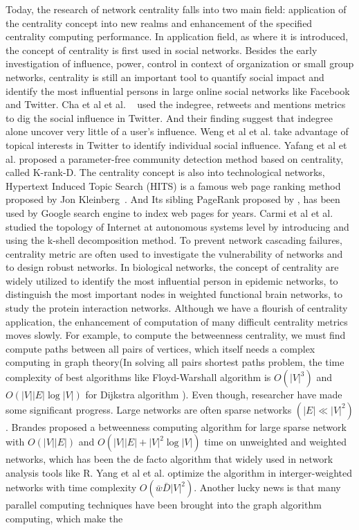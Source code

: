 \documentclass[symmetry,article,submit,moreauthors,pdftex,10pt,a4paper]{Definitions/mdpi}
\makeatletter
\newcommand*{\etal}{%
    \@ifnextchar{.}%
        {et al}%
        {et al.\@\xspace}%
}
\makeatother
\begin{document}
Today, the research of network centrality falls into two main field: application of the centrality concept into new realms and enhancement of the specified centrality computing performance. In application field, as where it is introduced, the concept of centrality is first used in social networks. Besides the early investigation of influence, power, control in context of organization or small group networks\cite{coleman1966medical, laumann1973new, granovetter1995getting, burt1982toward }, centrality is still an important tool to quantify social impact and identify the most influential persons in large online social networks like Facebook and Twitter.  Cha \etal~\cite{Cha2010Measuring} used the indegree, retweets and mentions metrics to dig the social influence in Twitter.  And their finding suggest that indegree alone uncover very little of a user's influence.  Weng \etal \cite{weng2014topicality} take advantage of topical interests in Twitter to identify individual social influence. Yafang \etal proposed a parameter-free community detection method based on centrality, called K-rank-D. The centrality concept is also into technological networks, Hypertext Induced Topic Search (HITS) is a famous web page ranking method proposed by Jon Kleinberg~\cite{kleinberg1999authoritative}. And Its sibling PageRank proposed by \cite{brin2012reprint}, has been used by Google search engine to index web pages for years.  Carmi \etal\cite{carmi2007model} studied the topology of Internet at autonomous systems level by introducing and using the k-shell decomposition method. To prevent network cascading failures, centrality metric are often used to investigate the vulnerability of networks and to design robust networks\cite{crucitti2004model, duenas2009cascading, wang2008attack}. In biological networks, the concept of centrality are widely utilized to identify the most influential person in epidemic networks\cite{vsikic2013epidemic}, to distinguish the most important nodes in weighted functional brain networks\cite{kuhnert2012identifying}, to study the protein interaction networks\cite{jeong2001lethality,  wang2011hkc}. Although we have a flourish of centrality application, the enhancement of computation of many difficult centrality metrics moves slowly. For example, to compute the betweenness centrality, we must find compute paths between all pairs of vertices, which itself needs a complex computing in graph theory(In solving all pairs shortest paths problem, the time complexity of best algorithms like Floyd-Warshall algorithm is $O(|V|^3)$ and $O(|V||E|\log|V|)$ for Dijkstra algorithm ). Even though, researcher have made some significant progress. Large networks are often sparse networks $(|E| \ll |V|^2)$. Brandes\cite{brandes2001faster} proposed a betweenness computing algorithm for large sparse network with $O(|V||E|)$ and $O(|V||E|+|V|^2\log|V|)$ time on unweighted and weighted networks, which has been the de facto algorithm that widely used in network analysis tools like R. Yang \etal \cite{yang2011fast} optimize the algorithm in interger-weighted networks with time complexity $O(\bar{w}\bar{D}|V|^2)$. Another lucky news is that many parallel computing techniques\cite{low2012distributed, green2013faster, houngkaew2013x10} have been brought into the graph algorithm computing, which make the 
\end{document}
